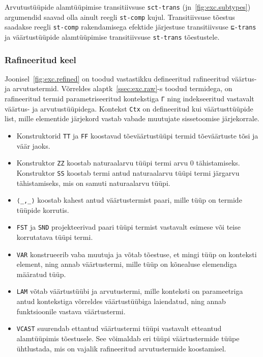 \documentclass[a4paper,12pt]{article}
\begin{document}
Arvutustüüpide alamtüüpimise transitiivsuse {\tt sct-trans} (jn~\ref{fig:exc.subtypes}) argumendid saavad olla ainult reegli {\tt st-comp} kujul. Transitiivsuse tõestus saadakse reegli {\tt st-comp} rakendamisega efektide järjestuse transitiivsuse {\tt ⊑-trans} ja väärtustüüpide alamtüüpimise transitiivsuse {\tt st-trans} tõestustele.

\subsubsection{Rafineeritud keel}

Joonisel~\ref{fig:exc.refined} on toodud vastastikku defineeritud rafineeritud väärtus- ja arvutustermid.
Võrreldes alaptk~\ref{ssec:exc.raw}-s toodud termidega, on rafineeritud termid parametriseeritud kontekstiga {\tt Γ} ning indekseeritud vastavalt väärtus- ja arvutustüüpidega.
Kontekst {\tt Ctx} on defineeritud kui väärtusttüüpide list, mille elementide järjekord vastab vabade muutujate sissetoomise järjekorrale.
\begin{itemize}
\item Konstruktorid {\tt TT} ja {\tt FF} koostavad tõeväärtustüüpi termid tõeväärtuste tõsi ja väär jaoks.
\item Konstruktor {\tt ZZ} koostab naturaalarvu tüüpi termi arvu 0 tähistamiseks. Konstruktor {\tt SS} koostab termi antud naturaalarvu tüüpi termi järgarvu tähistamiseks, mis on samuti naturaalarvu tüüpi.
\item {\tt ⟨_,_⟩} koostab kahest antud väärtustermist paari, mille tüüp on termide tüüpide korrutis.
\item {\tt FST} ja {\tt SND} projekteerivad paari tüüpi termist vastavalt esimese või teise korrutatava tüüpi termi.
\item {\tt VAR} konstrueerib vaba muutuja ja võtab tõestuse, et mingi tüüp on konteksti element, ning annab väärtustermi, mille tüüp on kõnealuse elemendiga määratud tüüp.
\item {\tt LAM} võtab väärtustüübi ja arvutustermi, mille konteksti on parameetriga antud kontekstiga võrreldes väärtustüübiga laiendatud, ning annab funktsioonile vastava väärtustermi.
\item {\tt VCAST} suurendab ettantud väärtustermi tüüpi vastavalt etteantud alamtüüpimis tõestusele. See võimaldab eri tüüpi väärtustermide tüüpe ühtlustada, mis on vajalik rafineeritud arvutustermide koostamisel.
\end{itemize}
\end{document}
